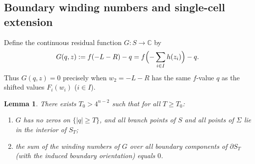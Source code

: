 \documentclass[11pt,a4paper]{amsart}
\numberwithin{equation}{section}
\newtheorem{lemma}[theorem]{Lemma}
\theoremstyle{definition}
\newcommand{\C}{\mathbb{C}}
\begin{document}
\subsection{Boundary winding numbers and single-cell extension}

Define the continuous residual function $G : S \to \C$ by
\[
G(q, z) := f(-L - R) - q = f\Bigl(-\sum_{i \in I} h(z_i)\Bigr) - q.
\]
Thus $G(q, z) = 0$ precisely when $w_2 = -L - R$ has the same $f$-value $q$ as the shifted values $F_i(w_i)$ ($i \in I$).

\begin{lemma}
\label{lem:boundary-winding}
There exists $T_0 > 4^{n-2}$ such that for all $T \ge T_0$:
\begin{enumerate}[label=\textup{(\alph*)}]
\item $G$ has no zeros on $\{|q| \ge T\}$, and all branch points of $S$ and all points of $\Sigma$ lie in the interior of $S_T$;
\item the sum of the winding numbers of $G$ over all boundary components of $\partial S_T$ (with the induced boundary orientation) equals $0$.
\end{enumerate}
\end{lemma}
\end{document}
